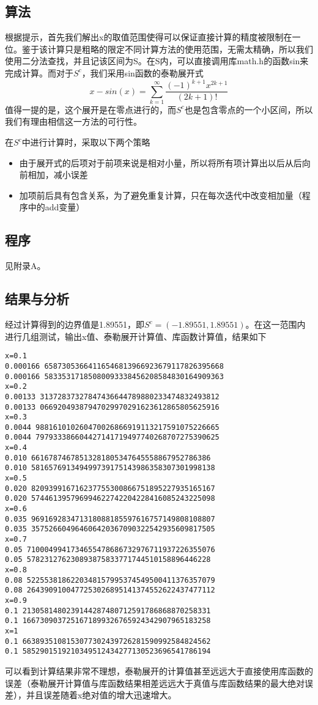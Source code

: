 \documentclass[a4paper,11pt,onecolumn,twoside]{article}
\begin{document}
\subsection{算法}
根据提示，首先我们解出x的取值范围使得可以保证直接计算的精度被限制在一位。鉴于该计算只是粗略的限定不同计算方法的使用范围，无需太精确，所以我们使用二分法查找，并且记该区间为S。在S内，可以直接调用库math.h的函数sin来完成计算。而对于$S^{c}$，我们采用sin函数的泰勒展开式$$x-sin(x)=\sum_{k=1}^{\infty} \frac{(-1)^{k+1}x^{2k+1}}{(2k+1)!}$$值得一提的是，这个展开是在零点进行的，而$S^{c}$也是包含零点的一个小区间，所以我们有理由相信这一方法的可行性。\par
在$S^{c}$中进行计算时，采取以下两个策略
\begin{itemize}
\item 由于展开式的后项对于前项来说是相对小量，所以将所有项计算出以后从后向前相加，减小误差
\item 加项前后具有包含关系，为了避免重复计算，只在每次迭代中改变相加量（程序中的add变量）
\end{itemize}
\subsection{程序}
见附录A。
\subsection{结果与分析}
经过计算得到的边界值是1.89551，即$S^{c}=(-1.89551,1.89551)$。在这一范围内进行几组测试，输出x值、泰勒展开计算值、库函数计算值，结果如下
\begin{lstlisting}
x=0.1
0.000166 65873053664116546813966923679117826395668
0.000166 58335317185080093338456208584830164909363
x=0.2
0.00133 31372837327847436644789880233474832493812
0.00133 06692049387947029970291623612865805625916
x=0.3
0.0044 988161010260470026866919113217591075226665
0.0044 797933386604427141719497740268707275390625
x=0.4
0.010 66167874678513281805347645558867952786386
0.010 581657691349499739175143986358307301998138
x=0.5
0.020 820939916716237755300866751895227935165167
0.020 574461395796994622742204228416085243225098
x=0.6
0.035 969169283471318088185597616757149808108807
0.035 357526604964606420367090322542935609817505
x=0.7
0.05 7100049941734655478686732976711937226355076
0.05 578231276230893875833771744510158896446228
x=0.8
0.08 5225538186220348157995374549500411376357079
0.08 2643909100477253026895141374552622437477112
x=0.9
0.1 2130581480239144287480712591786868870258331
0.1 1667309037251671899326765924342907965183258
x=1
0.1 6638935108153077302439726281590992584824562
0.1 5852901519210349512434277130523696541786194
\end{lstlisting}
可以看到计算结果非常不理想，泰勒展开的计算值甚至远远大于直接使用库函数的误差（泰勒展开计算值与库函数结果相差远远大于真值与库函数结果的最大绝对误差），并且误差随着x绝对值的增大迅速增大。
\end{document}
